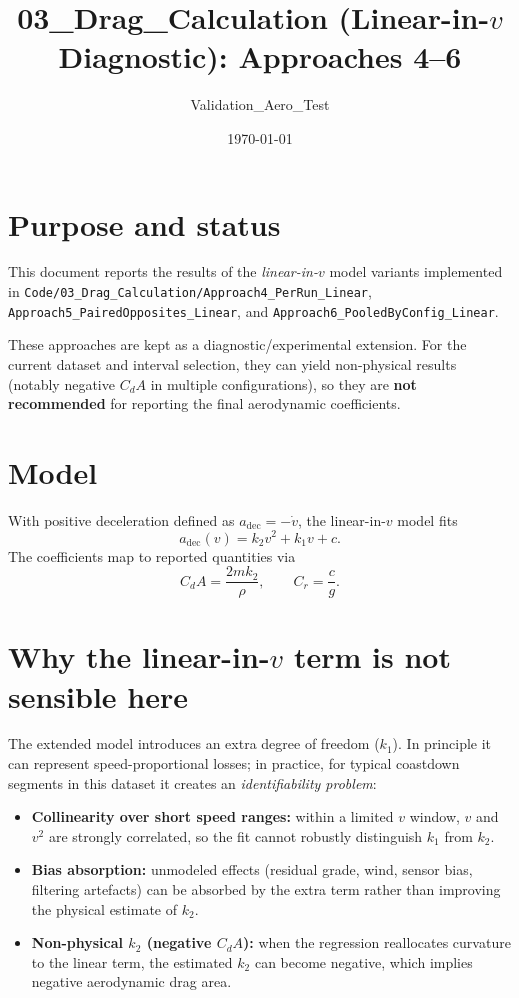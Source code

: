 \documentclass[11pt,a4paper]{article}
\title{03\_Drag\_Calculation (Linear-in-\(v\) Diagnostic): Approaches 4--6}
\author{Validation\_Aero\_Test}
\date{\today}
\begin{document}
\maketitle

\section{Purpose and status}
This document reports the results of the \emph{linear-in-\(v\)} model variants implemented in
\texttt{Code/03\_Drag\_Calculation/Approach4\_PerRun\_Linear},
\texttt{Approach5\_PairedOpposites\_Linear}, and
\texttt{Approach6\_PooledByConfig\_Linear}.

These approaches are kept as a diagnostic/experimental extension.
For the current dataset and interval selection, they can yield non-physical results (notably negative \(C_dA\) in multiple configurations), so they are \textbf{not recommended} for reporting the final aerodynamic coefficients.

\section{Model}
With positive deceleration defined as \(a_\mathrm{dec}=-\dot v\), the linear-in-\(v\) model fits
\[
  a_\mathrm{dec}(v) = k_2 v^2 + k_1 v + c.
\]
The coefficients map to reported quantities via
\[
  C_dA = \frac{2 m k_2}{\rho}, \qquad C_r = \frac{c}{g}.
\]

\section{Why the linear-in-\(v\) term is not sensible here}
The extended model introduces an extra degree of freedom (\(k_1\)). In principle it can represent speed-proportional losses; in practice, for typical coastdown segments in this dataset it creates an \emph{identifiability problem}:
\begin{itemize}
  \item \textbf{Collinearity over short speed ranges:} within a limited \(v\) window, \(v\) and \(v^2\) are strongly correlated, so the fit cannot robustly distinguish \(k_1\) from \(k_2\).
  \item \textbf{Bias absorption:} unmodeled effects (residual grade, wind, sensor bias, filtering artefacts) can be absorbed by the extra term rather than improving the physical estimate of \(k_2\).
  \item \textbf{Non-physical \(k_2\) (negative \(C_dA\)):} when the regression reallocates curvature to the linear term, the estimated \(k_2\) can become negative, which implies negative aerodynamic drag area.
\end{itemize}
\end{document}
